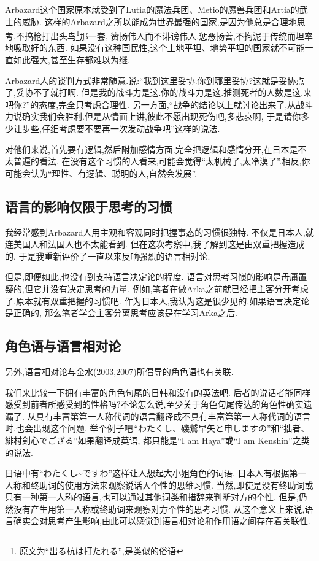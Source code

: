 Arbazard这个国家原本就受到了Lutia的魔法兵团、Metio的魔兽兵团和Artia的武士的威胁.
这样的Arbazard之所以能成为世界最强的国家,是因为他总是合理地思考,不搞枪打出头鸟\footnote{原文为``出る杭は打たれる'',是类似的俗语}那一套,
赞扬伟人而不诽谤伟人,惩恶扬善,不拘泥于传统而坦率地吸取好的东西.
如果没有这种国民性,这个土地平坦、地势平坦的国家就不可能一直如此强大,甚至生存都难以为继.

Arbazard人的谈判方式非常随意.说:“我到这里妥协.你到哪里妥协?这就是妥协点了,妥协不了就打啊.
但是我的战斗力是这.你的战斗力是这.推测死者的人数是这.来吧你?”的态度,完全只考虑合理性.
另一方面,“战争的结论以上就讨论出来了,从战斗力说确实我们会胜利.但是从情面上讲,彼此不愿出现死伤吧,多悲哀啊,
于是请你多少让步些,仔细考虑要不要再一次发动战争吧”这样的说法.

对他们来说,首先要有逻辑,然后附加感情方面.完全把逻辑和感情分开,在日本是不太普遍的看法.
在没有这个习惯的人看来,可能会觉得“太机械了,太冷漠了”.相反,你可能会认为“理性、有逻辑、聪明的人,自然会发展”.
\subsection{语言的影响仅限于思考的习惯}
我经常感到Arbazard人用主观和客观同时把握事态的习惯很独特.
不仅是日本人,就连美国人和法国人也不太能看到.
但在这次考察中,我了解到这是由双重把握造成的,
于是我重新评价了一直以来反响强烈的语言相对论.

但是,即便如此,也没有到支持语言决定论的程度.
语言对思考习惯的影响是毋庸置疑的,但它并没有决定思考的力量.
例如,笔者在做Arka之前就已经把主客分开考虑了,原本就有双重把握的习惯吧.
作为日本人,我认为这是很少见的,如果语言决定论是正确的,
那么笔者学会主客分离思考应该是在学习Arka之后.

\subsection{角色语与语言相对论}
另外,语言相对论与金水(2003,2007)所倡导的角色语也有关联.

我们来比较一下拥有丰富的角色句尾的日韩和没有的英法吧.
后者的说话者能同样感受到前者所感受到的性格吗?不论怎么说,至少关于角色句尾传达的角色性确实遗漏了.
从具有丰富第第一人称代词的语言翻译成不具有丰富第第一人称代词的语言时,也会出现这个问题.
举个例子吧.“わたくし、磯鷲早矢と申しますの”和“拙者、緋村剣心でござる”如果翻译成英语,
都只能是“I am Haya”或“I am Kenshin”之类的说法.

日语中有“わたくし\~{}ですわ”这样让人想起大小姐角色的词语.
日本人有根据第一人称和终助词的使用方法来观察说话人个性的思维习惯.
当然,即使是没有终助词或只有一种第一人称的语言,也可以通过其他词类和措辞来判断对方的个性.
但是,仍然没有产生用第一人称或终助词来观察对方个性的思考习惯.
从这个意义上来说,语言确实会对思考产生影响,由此可以感觉到语言相对论和作用语之间存在着关联性.


